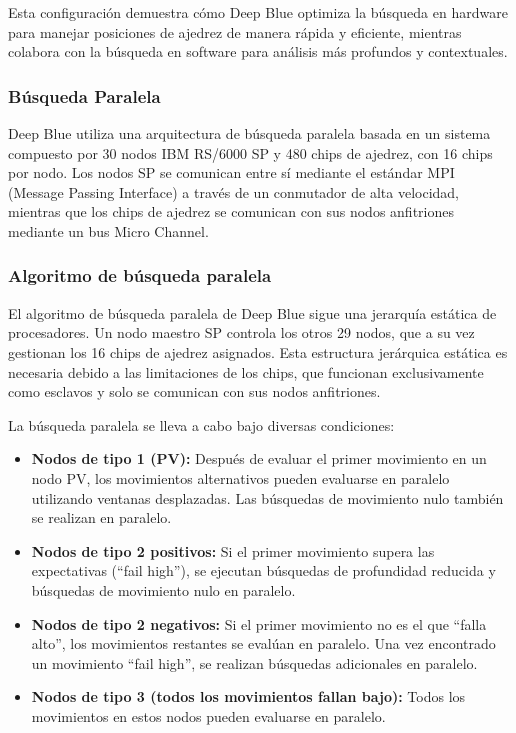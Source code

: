 \documentclass[12pt,a4paper]{article}
\begin{document}
Esta configuración demuestra cómo Deep Blue optimiza la búsqueda en hardware para manejar posiciones de ajedrez de manera rápida y eficiente, mientras colabora con la búsqueda en software para análisis más profundos y contextuales.

\subsubsection{Búsqueda Paralela}

Deep Blue utiliza una arquitectura de búsqueda paralela basada en un sistema compuesto por 30 nodos IBM RS/6000 SP y 480 chips de ajedrez, con 16 chips por nodo. Los nodos SP se comunican entre sí mediante el estándar MPI (Message Passing Interface) a través de un conmutador de alta velocidad, mientras que los chips de ajedrez se comunican con sus nodos anfitriones mediante un bus Micro Channel.

\subsubsection*{Algoritmo de búsqueda paralela}
El algoritmo de búsqueda paralela de Deep Blue sigue una jerarquía estática de procesadores. Un nodo maestro SP controla los otros 29 nodos, que a su vez gestionan los 16 chips de ajedrez asignados. Esta estructura jerárquica estática es necesaria debido a las limitaciones de los chips, que funcionan exclusivamente como esclavos y solo se comunican con sus nodos anfitriones.

La búsqueda paralela se lleva a cabo bajo diversas condiciones:
\begin{itemize}
    \item \textbf{Nodos de tipo 1 (PV):} Después de evaluar el primer movimiento en un nodo PV, los movimientos alternativos pueden evaluarse en paralelo utilizando ventanas desplazadas. Las búsquedas de movimiento nulo también se realizan en paralelo.
    \item \textbf{Nodos de tipo 2 positivos:} Si el primer movimiento supera las expectativas (``fail high''), se ejecutan búsquedas de profundidad reducida y búsquedas de movimiento nulo en paralelo.
    \item \textbf{Nodos de tipo 2 negativos:} Si el primer movimiento no es el que ``falla alto'', los movimientos restantes se evalúan en paralelo. Una vez encontrado un movimiento ``fail high'', se realizan búsquedas adicionales en paralelo.
    \item \textbf{Nodos de tipo 3 (todos los movimientos fallan bajo):} Todos los movimientos en estos nodos pueden evaluarse en paralelo.
\end{itemize}
\end{document}

